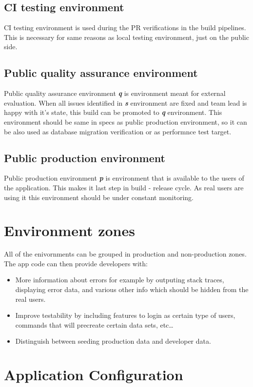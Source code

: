 \documentclass[lang=en,color=green]{elegantbook}
\newcommand{\bi}[1]{\textit{\textbf{#1}}}
\begin{document}
\subsection{CI testing environment}
CI testing environment is used during the PR verifications in the build
pipelines. This is necessary for same reasons as local testing environment,
just on the public side. 

\subsection{Public quality assurance environment}
Public quality assurance environment \bi{q} is environment meant
for external evaluation. When all issues identified in \bi{s} environment
are fixed and team lead is happy with it's state, this build can be promoted
to \bi{q} environment. This environment should be same in specs as 
public production environment, so it can be also used as database
migration verification or as performnce test target. 

\subsection{Public production environment}
Public production environment \bi{p} is environment that is available to the 
users of the application. This makes it last step in build - release cycle.
As real users are using it this environment should be under constant monitoring.

\section{Environment zones}
All of the enivornments can be grouped in production and non-production zones.
The app code can then provide developers with:
\begin{itemize}
    \item More information about errors for example by outputing
 stack traces, displaying error data, and various other info which should be
 hidden from the real users.
    \item Improve testability by including features to login as certain type
    of users, commands that will precreate certain data sets, etc\dots
    \item Distinguish between seeding production data and developer data.
\end{itemize} 


\section{Application Configuration}
\end{document}
